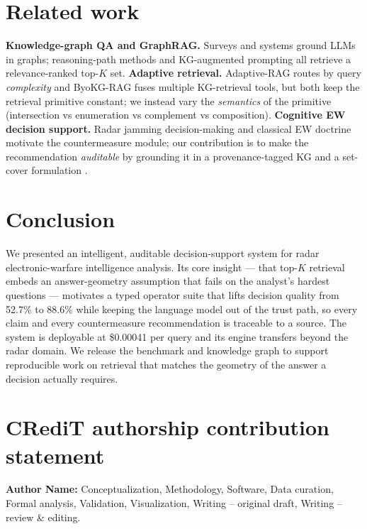 \documentclass[review]{elsarticle}
\begin{document}
\section{Related work}
\label{sec:related}

\textbf{Knowledge-graph QA and GraphRAG.} Surveys \citep{peng2025graphrag} and
systems \citep{edge2024graphrag,gutierrez2024hipporag} ground LLMs in graphs;
reasoning-path methods
\citep{luo2024rog,sun2024tog,ma2025tog2,jiang2023structgpt} and KG-augmented
prompting \citep{baek2023kaping} all retrieve a relevance-ranked top-$K$ set.
\textbf{Adaptive retrieval.} Adaptive-RAG \citep{jeong2024adaptiverag} routes
by query \emph{complexity} and ByoKG-RAG \citep{byokgrag2025} fuses multiple
KG-retrieval tools, but both keep the retrieval primitive constant; we instead
vary the \emph{semantics} of the primitive (intersection vs enumeration vs
complement vs composition). \textbf{Cognitive EW decision support.} Radar
jamming decision-making \citep{zhang2023cognitiveew} and classical EW doctrine
\citep{adamy2001ew101,schleher1999ew} motivate the countermeasure module; our
contribution is to make the recommendation \emph{auditable} by grounding it in
a provenance-tagged KG and a set-cover formulation \citep{chvatal1979setcover}.

\section{Conclusion}
\label{sec:conclusion}

We presented an intelligent, auditable decision-support system for radar
electronic-warfare intelligence analysis. Its core insight --- that top-$K$
retrieval embeds an answer-geometry assumption that fails on the analyst's
hardest questions --- motivates a typed operator suite that lifts decision
quality from 52.7\% to 88.6\% while keeping the language model out of the trust
path, so every claim and every countermeasure recommendation is traceable to a
source. The system is deployable at \$0.00041 per query and its engine
transfers beyond the radar domain. We release the benchmark and knowledge graph
to support reproducible work on retrieval that matches the geometry of the
answer a decision actually requires.

\section*{CRediT authorship contribution statement}
\textbf{Author Name:} Conceptualization, Methodology, Software, Data curation, Formal analysis, Validation, Visualization, Writing -- original draft, Writing -- review \& editing.
\end{document}
